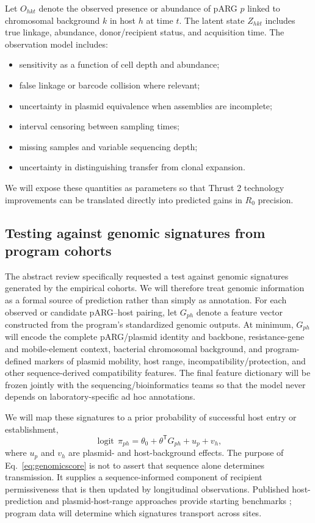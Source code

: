 \documentclass[12pt,a4paper]{article}
\begin{document}
Let $O_{hkt}$ denote the observed presence or abundance of pARG $p$ linked to chromosomal background $k$ in host $h$ at time $t$. The latent state $Z_{hkt}$ includes true linkage, abundance, donor/recipient status, and acquisition time. The observation model includes:
\begin{itemize}
\item sensitivity as a function of cell depth and abundance;
\item false linkage or barcode collision where relevant;
\item uncertainty in plasmid equivalence when assemblies are incomplete;
\item interval censoring between sampling times;
\item missing samples and variable sequencing depth;
\item uncertainty in distinguishing transfer from clonal expansion.
\end{itemize}
We will expose these quantities as parameters so that Thrust 2 technology improvements can be translated directly into predicted gains in $R_0$ precision.


\subsection{Testing against genomic signatures from program cohorts}
\label{sec:genomic_validation}

The abstract review specifically requested a test against genomic signatures generated by the empirical cohorts. We will therefore treat genomic information as a formal source of prediction rather than simply as annotation. For each observed or candidate pARG--host pairing, let $G_{ph}$ denote a feature vector constructed from the program's standardized genomic outputs. At minimum, $G_{ph}$ will encode the complete pARG/plasmid identity and backbone, resistance-gene and mobile-element context, bacterial chromosomal background, and program-defined markers of plasmid mobility, host range, incompatibility/protection, and other sequence-derived compatibility features. The final feature dictionary will be frozen jointly with the sequencing/bioinformatics teams so that the model never depends on laboratory-specific ad hoc annotations.

We will map these signatures to a prior probability of successful host entry or establishment,
\begin{equation}
\operatorname{logit}\,\pi_{ph}=\theta_0+\theta^{\mathsf T}G_{ph}+u_p+v_h,
\label{eq:genomicscore}
\end{equation}
where $u_p$ and $v_h$ are plasmid- and host-background effects. The purpose of Eq.~\eqref{eq:genomicscore} is not to assert that sequence alone determines transmission. It supplies a sequence-informed component of recipient permissiveness that is then updated by longitudinal observations. Published host-prediction and plasmid-host-range approaches provide starting benchmarks \citep{aytanaktug2022,ono2026}; program data will determine which signatures transport across sites.
\end{document}
